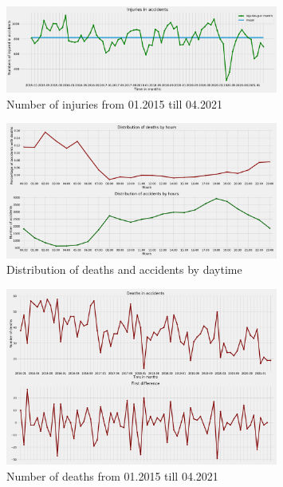 \begin{figure}[htpb]
	\centering
	\includegraphics[width=0.8\textwidth]{../imgs/pdf_files/ts_injuries.pdf}
	\caption{Number of injuries from 01.2015 till 04.2021}
	\label{fig:ts_inj}
\end{figure}

\begin{figure}[htpb]
	\centering
	\includegraphics[width=0.8\textwidth]{../imgs/pdf_files/ts_distributions.pdf}
	\caption{Distribution of deaths and accidents by daytime}
	\label{fig:ts_dist}
\end{figure}
\begin{figure}[htpb]
	\centering
	\includegraphics[width=0.8\textwidth]{../imgs/pdf_files/ts_death_first_diff.pdf}
	\caption{Number of deaths from 01.2015 till 04.2021}
	\label{fig:ts_death}
\end{figure}
